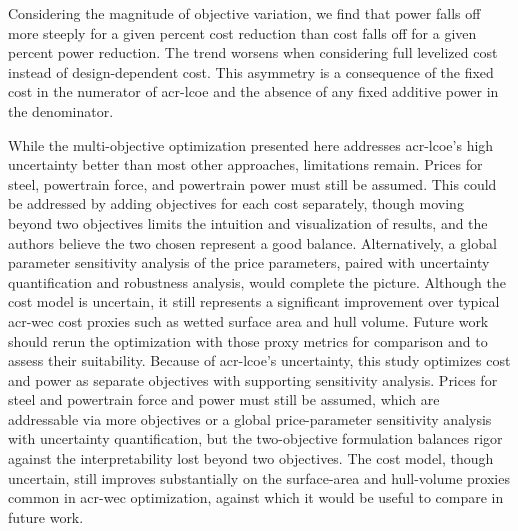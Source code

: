 Considering the magnitude of objective variation,
we find that power falls off more steeply for a given percent cost reduction than cost falls off for a given percent power reduction.
The trend worsens when considering full levelized cost instead of design-dependent cost.
This asymmetry is a consequence of the fixed cost in the numerator of \gls{acr-lcoe} and the absence of any fixed additive power in the denominator.

\ifdefined\DISSERTATION
    While the multi-objective optimization presented here addresses \gls{acr-lcoe}'s high uncertainty better than most other approaches, limitations remain.
    Prices for steel, powertrain force, and powertrain power must still be assumed.
    This could be addressed by adding objectives for each cost separately,
    though moving beyond two objectives limits the intuition and visualization of results,
    and the authors believe the two chosen represent a good balance.
    Alternatively, a global parameter sensitivity analysis of the price parameters,
    paired with uncertainty quantification and robustness analysis, would complete the picture.
    Although the cost model is uncertain, it still represents a significant improvement over typical \gls{acr-wec} cost proxies such as wetted surface area and hull volume.
    Future work should rerun the optimization with those proxy metrics for comparison and to assess their suitability.
\else
    Because of \gls{acr-lcoe}'s uncertainty, this study optimizes cost and power as separate objectives with supporting sensitivity analysis.
    Prices for steel and powertrain force and power must still be assumed, which are addressable via more objectives or a global price-parameter sensitivity analysis with uncertainty quantification,
    but the two-objective formulation balances rigor against the interpretability lost beyond two objectives.
    The cost model, though uncertain, still improves substantially on the surface-area and hull-volume proxies common in \gls{acr-wec} optimization, against which it would be useful to compare in future work.
\fi




